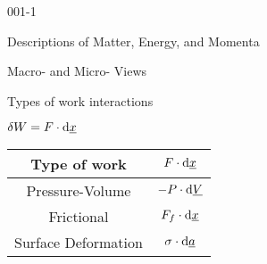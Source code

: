 \begin{mitframe}{001-1} %
	

	\begin{listone}
		\item Descriptions of Matter, Energy, and Momenta
		\item Macro- and Micro- Views
	\end{listone}

	{
	\centering 

	Types of work interactions

	$\delta\work = \force \cdot \mathrm{d}\gendisp$
        
        
        
                
	\begin{longtable}{ | c | c | } \hline       
	           
		Type of work & $\force \cdot \mathrm{d}\gendisp$ \\ \hline
	            
		Pressure-Volume & $-\p \cdot \mathrm{d}\uline{\vol}$ \\ \hline            
	            
		Frictional & $\fricforce \cdot \mathrm{d}\gendisp$ \\ \hline
            	           
		Surface Deformation & $\surftens \cdot \mathrm{d}\totalsa$ \\ \hline            
     

\end{longtable}}
\end{mitframe}
